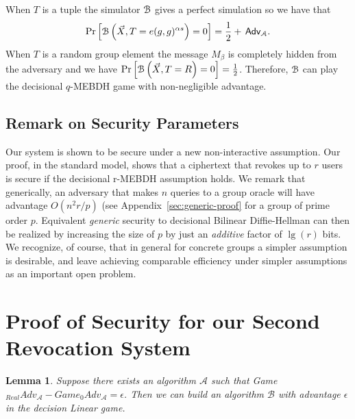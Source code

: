 \documentclass[a4paper, 11pt]{article}
\newtheorem{lemma}[theorem]{Lemma}
\newcommand{\Advx}[2]{\mathsf{{#1}\,Adv}_{#2}}
\newcommand{\Adv}[1] {\Advx{#1}{\AlgA}}
\newtheorem{lemma}[theorem]{Lemma}
\theoremstyle{definition}
\newcommand{\AlgA}{\ensuremath{{\cal A}}}
\newcommand{\AlgB}{\ensuremath{{\cal B}}}
\begin{document}
When $T$ is a tuple the simulator $\AlgB$ gives a perfect simulation
so we have that
\[\Pr\left[ \AlgB \left(\vec{X}, T=e(g,g)^{\alpha s} \right) = 0
  \right] = \frac{1}{2} + \Adv{}.
\]
When $T$ is a random group element the message $M_{\beta}$ is
completely hidden from the adversary and we have $\Pr\left[ \AlgB
  \left(\vec{X}, T=R \right) = 0 \right] = \frac{1}{2}$. Therefore,
$\AlgB$ can play the decisional $q$-MEBDH game with non-negligible
advantage.

\subsection{Remark on Security Parameters}
\label{sec:security-remark}
Our system is shown to be secure under a new non-interactive
assumption. Our proof, in the standard model, shows that a
ciphertext that revokes up to $r$ users is secure if the decisional
r-MEBDH assumption holds. We remark that generically, an adversary
that makes $n$ queries to a group oracle will have advantage
$O(n^2 r/p)$ (see Appendix~\ref{sec:generic-proof} for
a group of prime order $p$. Equivalent \emph{generic} security to
decisional Bilinear Diffie-Hellman can then be realized by increasing
the size of $p$ by just an \emph{additive} factor of $\lg(r)$ bits. We recognize, of course, that
in general for concrete groups a simpler assumption is desirable, and
leave achieving comparable efficiency under simpler assumptions as an
important open problem.

\section{Proof of Security for our Second Revocation System}
\label{sec:system2proof}

\begin{lemma}Suppose there exists an algorithm $\mathcal{A}$ such that Game$_{Real}Adv_{\mathcal{A}} - Game_0 Adv_{\mathcal{A}} = \epsilon$. Then we can build an algorithm $\mathcal{B}$ with advantage $\epsilon$ in the decision Linear game.
\end{lemma}
\end{document}
